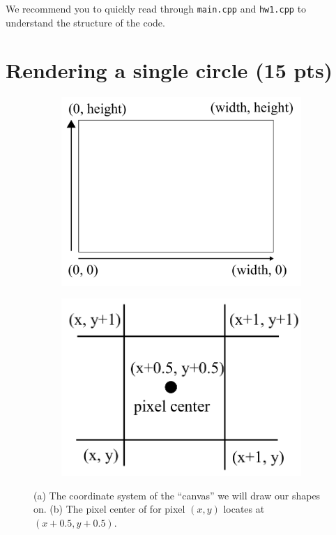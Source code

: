 We recommend you to quickly read through \lstinline{main.cpp} and \lstinline{hw1.cpp} to understand the structure of the code.

\section{Rendering a single circle (15 pts)}

\begin{figure}[h]
    \centering
    \begin{subfigure}[t]{0.4\linewidth}
        \centering
        \includegraphics[width=\linewidth]{imgs/canvas.pdf}
        \caption{\label{fig:canvas}}
    \end{subfigure}
    \begin{subfigure}[t]{0.4\linewidth}
        \centering
        \includegraphics[width=\linewidth]{imgs/pixel.pdf}
        \caption{\label{fig:pixel}}
    \end{subfigure}
    \caption{(a) The coordinate system of the ``canvas'' we will draw our shapes on. (b) The pixel center of for pixel $(x, y)$ locates at $(x+0.5, y+0.5)$.}
\end{figure}


